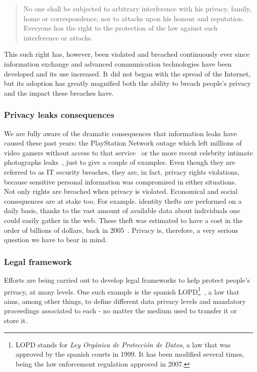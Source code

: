 \begin{quote}
No one shall be subjected to arbitrary interference with his privacy, family, home or correspondence, nor to attacks upon his honour and reputation. Everyone has the right to the protection of the law against such interference or attacks.
\end{quote}

This such right has, however, been violated and breached continuously ever since information exchange and advanced communication technologies have been developed and its use increased. It did not began with the spread of the Internet, but its adoption has greatly magnified both the ability to breach people’s privacy and the impact these breaches have.

\subsubsection{Privacy leaks consequences}

We are fully aware of the dramatic consequences that information leaks have caused these past years: the PlayStation Network outage which left millions of video gamers without access to that service~\cite{playstation1} or the more recent celebrity intimate photographs leaks~\cite{celebrities}, just to give a couple of examples. Even though they are referred to as IT security breaches, they are, in fact, privacy rights violations, because sensitive personal information was compromised in either situations.\\

Not only rights are breached when privacy is violated. Economical and social consequences are at stake too. For example. identity thefts are performed on a daily basis, thanks to the vast amount of available data about individuals one could easily gather in the web. These theft was estimated to have a cost in the order of billions of dollars, back in 2005~\cite{DisclosureLaws}. Privacy is, therefore, a very serious question we have to bear in mind.

\subsubsection{Legal framework}

Efforts are being carried out to develop legal frameworks to help protect people’s privacy, at many levels. One such example is the spanish LOPD\footnote{LOPD stands for \textit{Ley Orgánica de Protección de Datos}, a law that was approved by the spanish courts in 1999. It has been modified several times, being the law enforcement regulation approved in 2007.}~\cite{lopd}, a law that aims, among other things, to define different data privacy levels and mandatory proceedings associated to each - no matter the medium used to transfer it or store it.\\

